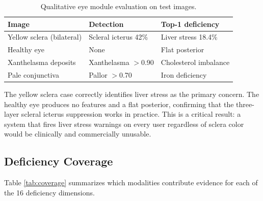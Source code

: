 \documentclass[journal]{IEEEtran}
\begin{document}
\begin{table}[h]
\centering
\caption{Qualitative eye module evaluation on test images.}
\label{tab:qualitative}
\begin{tabular}{p{2.1cm}p{1.8cm}p{2.5cm}}
\toprule
\textbf{Image} & \textbf{Detection} & \textbf{Top-1 deficiency} \\
\midrule
Yellow sclera (bilateral) & Scleral icterus 42\% & Liver stress 18.4\% \\
Healthy eye               & None                  & Flat posterior \\
Xanthelasma deposits      & Xanthelasma $>$0.90   & Cholesterol imbalance \\
Pale conjunctiva          & Pallor $>$0.70        & Iron deficiency \\
\bottomrule
\end{tabular}
\end{table}

The yellow sclera case correctly identifies liver stress as the primary
concern. The healthy eye produces no features and a flat posterior,
confirming that the three-layer scleral icterus suppression works in
practice. This is a critical result: a system that fires liver stress
warnings on every user regardless of sclera color would be clinically
and commercially unusable.

\subsection{Deficiency Coverage}

Table \ref{tab:coverage} summarizes which modalities contribute evidence
for each of the 16 deficiency dimensions.
\end{document}
